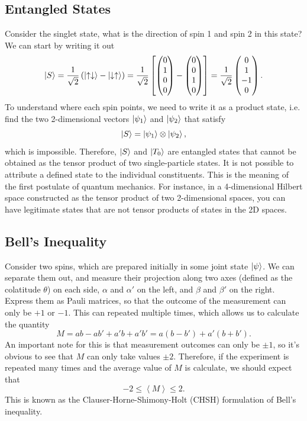 \documentclass{article}
\begin{document}
\subsection{Entangled States}
Consider the singlet state, what is the direction of spin 1 and spin 2 in this state? We can start by writing it out
\[
    \ket{S}=\frac{1}{\sqrt{2}}\left( \ket{\uparrow \downarrow}-\ket{\downarrow \uparrow} \right)=\frac{1}{\sqrt{2}} \left[\begin{pmatrix}
        0\\1\\0\\0
    \end{pmatrix}-\begin{pmatrix}
        0\\0\\1\\0
    \end{pmatrix} \right] =\frac{1}{\sqrt{2}}\begin{pmatrix}
        0\\1\\-1\\0
    \end{pmatrix}.
\]
To understand where each spin points, we need to write it as a product state, i.e. find the two 2-dimensional vectors $\ket{\psi _1}$ and $\ket{\psi_2 }$ that satisfy
\[
    \ket{S}=\ket{\psi _1}\otimes \ket{\psi _2}, 
\]
which is impossible. Therefore, $\ket{S}$ and $\ket{T_0}$ are entangled states that cannot be obtained as the tensor product of two single-particle states. It is not possible to attribute a defined state to the individual constituents. This is the meaning of the first postulate of quantum mechanics. For instance, in a 4-dimensional Hilbert space constructed as the tensor product of two 2-dimensional spaces, you can have legitimate states that are not tensor products of states in the 2D spaces.

\subsection{Bell's Inequality}
Consider two spins, which are prepared initially in some joint state $\ket{\psi }$. We can separate them out, and measure their projection along two axes (defined as the colatitude $\theta $) on each side, $\alpha $ and $\alpha'$ on the left, and $\beta $ and $\beta'$ on the right. Express them as Pauli matrices, so that the outcome of the measurement can only be $+1$ or $-1$. This can repeated multiple times, which allows us to calculate the quantity
\[
    M=ab-ab'+a'b+a'b'=a(b-b')+a'(b+b').
\]
An important note for this is that measurement outcomes can only be $\pm 1$, so it's obvious to see that $M$ can only take values $\pm 2$. Therefore, if the experiment is repeated many times and the average value of $M$ is calculate, we should expect that
\[
    -2\leq \left\langle M \right\rangle \leq 2.
\]
This is known as the Clauser-Horne-Shimony-Holt (CHSH) formulation of Bell's inequality.
\end{document}

